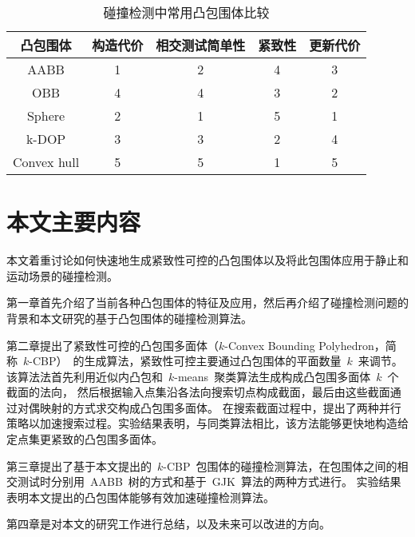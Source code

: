 \begin{table}[htbp]
\centering
\caption{碰撞检测中常用凸包围体比较}
\begin{tabular}{ccccc}
\toprule[1.5pt]
凸包围体 & 构造代价 & 相交测试简单性 & 紧致性 & 更新代价\\
\midrule[1.0pt]
AABB   & 1 & 2 & 4 & 3\\
OBB    & 4 & 4 & 3 & 2\\
Sphere & 2 & 1 & 5 & 1\\
k-DOP  & 3 & 3 & 2 & 4\\
Convex hull & 5 & 5 & 1 & 5 \\
\bottomrule[1.5pt]
\end{tabular}
\label{lbl:table:bv-comp}
\end{table}


\section{本文主要内容}
\label{sec:structure}
本文着重讨论如何快速地生成紧致性可控的凸包围体以及将此包围体应用于静止和运动场景的碰撞检测。

第一章首先介绍了当前各种凸包围体的特征及应用，然后再介绍了碰撞检测问题的背景和本文研究的基于凸包围体的碰撞检测算法。

第二章提出了紧致性可控的凸包围多面体（$k$-Convex Bounding Polyhedron，简称~$k$-CBP）~的生成算法，紧致性可控主要通过凸包围体的平面数量~$k$~来调节。
该算法法首先利用近似内凸包和~$k$-means~聚类算法生成构成凸包围多面体~$k$~个截面的法向，
然后根据输入点集沿各法向搜索切点构成截面，最后由这些截面通过对偶映射的方式求交构成凸包围多面体。
在搜索截面过程中，提出了两种并行策略以加速搜索过程。实验结果表明，与同类算法相比，该方法能够更快地构造给定点集更紧致的凸包围多面体。

第三章提出了基于本文提出的~$k$-CBP~包围体的碰撞检测算法，在包围体之间的相交测试时分别用~AABB~树的方式和基于~GJK~算法的两种方式进行。
实验结果表明本文提出的凸包围体能够有效加速碰撞检测算法。

第四章是对本文的研究工作进行总结，以及未来可以改进的方向。
